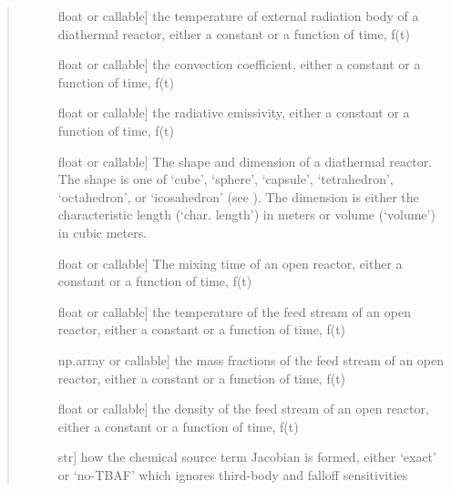 \documentclass[letterpaper,10pt,english]{sphinxmanual}
\begin{document}
\begin{fulllineitems}
\begin{quote}
\begin{description}
\begin{description}
\item[{}] \leavevmode{[}float or callable{]}
the temperature of external radiation body of a diathermal reactor, either a constant or a function of time, f(t)

\item[{}] \leavevmode{[}float or callable{]}
the convection coefficient, either a constant or a function of time, f(t)

\item[{}] \leavevmode{[}float or callable{]}
the radiative emissivity, either a constant or a function of time, f(t)

\item[{}] \leavevmode{[}float or callable{]}
The shape and dimension of a diathermal reactor. The shape is one of ‘cube’, ‘sphere’, ‘capsule’, ‘tetrahedron’, ‘octahedron’, or ‘icosahedron’
(see ).
The dimension is either the characteristic length (‘char. length’) in meters or volume (‘volume’) in cubic meters.

\item[{}] \leavevmode{[}float or callable{]}
The mixing time of an open reactor, either a constant or a function of time, f(t)

\item[{}] \leavevmode{[}float or callable{]}
the temperature of the feed stream of an open reactor, either a constant or a function of time, f(t)

\item[{}] \leavevmode{[}np.array or callable{]}
the mass fractions of the feed stream of an open reactor, either a constant or a function of time, f(t)

\item[{}] \leavevmode{[}float or callable{]}
the density of the feed stream of an open reactor, either a constant or a function of time, f(t)

\item[{}] \leavevmode{[}str{]}
how the chemical source term Jacobian is formed, either ‘exact’ or ‘no-TBAF’ which ignores third-body and falloff sensitivities


\end{description}
\end{description}
\end{quote}
\end{fulllineitems}
\end{document}
